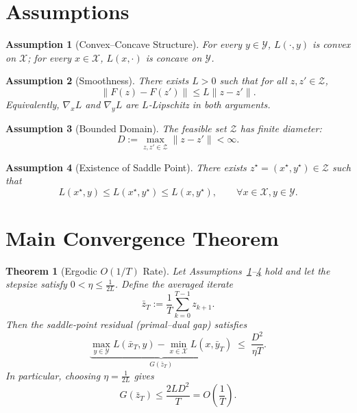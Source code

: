 \documentclass{article}
\newtheorem{theorem}{Theorem}
\newtheorem{assumption}{Assumption}
\begin{document}
\newpage

\section*{Assumptions}
\begin{assumption}[Convex–Concave Structure]\label{assump:cc}
For every $y\in\mathcal{Y}$, $L(\cdot ,y)$ is convex on $\mathcal{X}$;  
for every $x\in\mathcal{X}$, $L(x,\cdot )$ is concave on $\mathcal{Y}$.
\end{assumption}
\begin{assumption}[Smoothness]\label{assump:smooth}
There exists $L>0$ such that for all $z,z'\in\mathcal{Z}$,
\[
\|F(z)-F(z')\|\le L\|z-z'\|. 
\]
Equivalently, $\nabla_{x}L$ and $\nabla_{y}L$ are $L$‑Lipschitz in both arguments.
\end{assumption}
\begin{assumption}[Bounded Domain]\label{assump:bounded}
The feasible set $\mathcal{Z}$ has finite diameter:
\[
D:=\max_{z,z'\in\mathcal{Z}}\|z-z'\|<\infty .
\]
\end{assumption}
\begin{assumption}[Existence of Saddle Point]\label{assump:saddle}
There exists $z^{\star}=(x^{\star},y^{\star})\in\mathcal{Z}$ such that
\[
L(x^{\star},y)\le L(x^{\star},y^{\star})\le L(x,y^{\star}),\qquad\forall x\in\mathcal{X},y\in\mathcal{Y}.
\]
\end{assumption}

\section*{Main Convergence Theorem}
\begin{theorem}[Ergodic $O(1/T)$ Rate]\label{thm:ergodic}
Let Assumptions~\ref{assump:cc}–\ref{assump:saddle} hold and let the stepsize satisfy $0<\eta\le \frac{1}{2L}$.  
Define the averaged iterate
\[
\bar z_{T}:=\frac{1}{T}\sum_{k=0}^{T-1}z_{k+1}.
\]
Then the saddle‑point residual (primal–dual gap) satisfies
\[
\underbrace{\max_{y\in\mathcal{Y}}L(\bar x_{T},y)-\min_{x\in\mathcal{X}}L(x,\bar y_{T})}_{\displaystyle G(\bar z_{T})}
\;\le\;
\frac{D^{2}}{\eta T}.
\]
In particular, choosing $\eta=\frac{1}{2L}$ gives
\[
G(\bar z_{T})\le \frac{2L D^{2}}{T}=O\!\left(\frac{1}{T}\right).
\]
\end{theorem}
\end{document}
